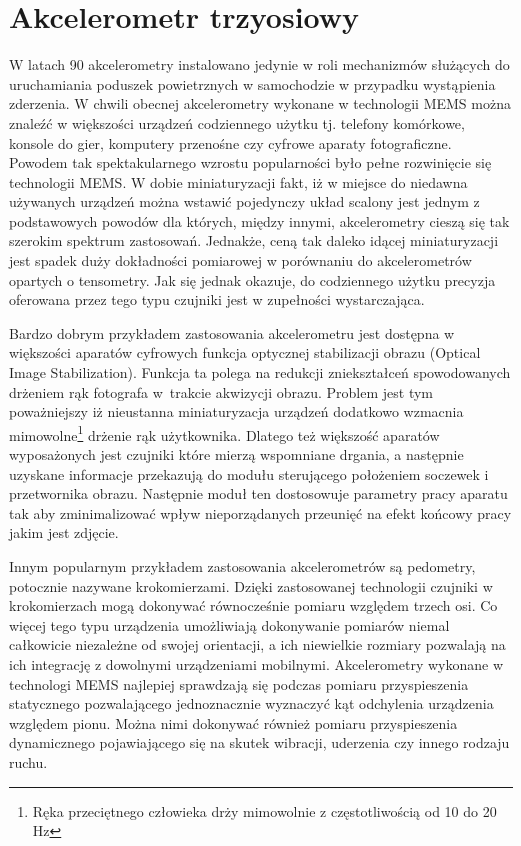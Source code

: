\section{Akcelerometr trzyosiowy}
W latach 90 akcelerometry instalowano jedynie w roli mechanizmów służących do
uruchamiania poduszek powietrznych w samochodzie w przypadku wystąpienia
zderzenia. W chwili obecnej akcelerometry wykonane w technologii
MEMS można znaleźć w większości urządzeń codziennego użytku tj.
telefony komórkowe, konsole do gier, komputery przenośne czy cyfrowe aparaty
fotograficzne. Powodem tak spektakularnego wzrostu popularności było pełne
rozwinięcie się technologii MEMS. W dobie miniaturyzacji fakt, iż w miejsce do
niedawna używanych urządzeń można wstawić pojedynczy układ
scalony jest jednym z podstawowych powodów dla których, między innymi,
akcelerometry cieszą się tak szerokim spektrum zastosowań. Jednakże, ceną tak
daleko idącej miniaturyzacji jest spadek duży dokładności pomiarowej w
porównaniu do akcelerometrów opartych o tensometry. Jak się jednak okazuje, do
codziennego użytku precyzja oferowana przez tego typu czujniki jest w zupełności wystarczająca.

Bardzo dobrym przykładem zastosowania akcelerometru jest dostępna w większości
aparatów cyfrowych funkcja optycznej stabilizacji obrazu (Optical Image
Stabilization). Funkcja ta polega na redukcji zniekształceń  spowodowanych
drżeniem rąk fotografa w~trakcie akwizycji obrazu. Problem jest tym poważniejszy
iż nieustanna miniaturyzacja urządzeń dodatkowo wzmacnia mimowolne\footnote{Ręka
przeciętnego człowieka drży mimowolnie z częstotliwością od 10 do 20 Hz} drżenie
rąk użytkownika. Dlatego też większość aparatów wyposażonych jest czujniki które
mierzą wspomniane drgania, a następnie uzyskane informacje przekazują do modułu
sterującego położeniem soczewek i przetwornika obrazu. Następnie moduł ten
dostosowuje parametry pracy aparatu tak aby zminimalizować wpływ nieporządanych przeunięć
na efekt końcowy pracy jakim jest zdjęcie.

Innym popularnym przykładem zastosowania akcelerometrów są pedometry, potocznie 
nazywane krokomierzami. Dzięki zastosowanej technologii czujniki w krokomierzach
mogą dokonywać równocześnie pomiaru względem trzech osi. Co więcej tego typu
urządzenia umożliwiają dokonywanie pomiarów niemal całkowicie niezależne od
swojej orientacji, a ich niewielkie rozmiary pozwalają na ich integrację z 
dowolnymi urządzeniami mobilnymi. Akcelerometry wykonane w technologi MEMS
najlepiej sprawdzają się  podczas pomiaru przyspieszenia statycznego
pozwalającego jednoznacznie wyznaczyć kąt odchylenia urządzenia względem pionu. 
Można nimi dokonywać również pomiaru przyspieszenia dynamicznego pojawiającego 
się na skutek wibracji, uderzenia czy innego rodzaju ruchu. 

